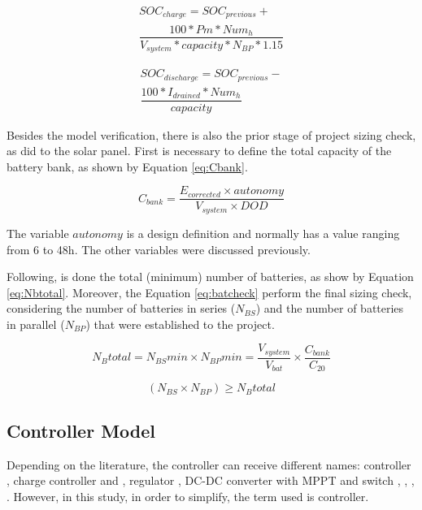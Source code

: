 \documentclass[journal]{IEEEtran}
\begin{document}
\begin{multline}
\label{eq:charge}
SOC_{charge} = SOC_{previous} + \\ \dfrac{100*Pm*Num_{h}}{V_{system}*capacity*N_{BP}*1.15}
\end{multline}

\begin{multline}
\label{eq:discharge}
SOC_{discharge} = SOC_{previous} - \\ \dfrac{100*I_{drained}*Num_{h}}{capacity}
\end{multline}


Besides the model verification, there is also the prior stage of project sizing check, as did to the solar panel. First is necessary to define the total capacity of the battery bank, as shown by Equation \ref{eq:Cbank}.

\begin{equation}
\label{eq:Cbank}
C_{bank} = \dfrac{E_{corrected} \times autonomy}{V_{system} \times DOD}
\end{equation}

The variable $ autonomy $ is a design definition and normally has a value ranging from 6 to 48h. The other variables were discussed previously.

Following, is done the total (minimum) number of batteries, as show by Equation \ref{eq:Nbtotal}. Moreover, the Equation \ref{eq:batcheck} perform the final sizing check, considering the number of batteries in series ($ N_{BS} $) and the number of batteries in parallel ($ N_{BP} $) that were established to the project.

\begin{equation}
\label{eq:Nbtotal}
N_{B}total = N_{BS}min \times N_{BP}min = \dfrac{V_{system}}{V_{bat}} \times \dfrac{C_{bank}}{C_{20}}
\end{equation}

\begin{equation}
\label{eq:batcheck}
\left( N_{BS} \times  N_{BP} \right) \geq N_{B}total
\end{equation}

\subsection{Controller Model}
Depending on the literature, the controller can receive different names: controller \cite{Hansen}, charge controller \cite{Mahanta} and \cite{Chauhan}, regulator \cite{Mellit}, DC-DC converter with MPPT and switch \cite{Dhanowa}, \cite{Yatimi}, \cite{Abdulateef}, \cite{Roy}. However, in this study, in order to simplify, the term used is controller. 
\end{document}
